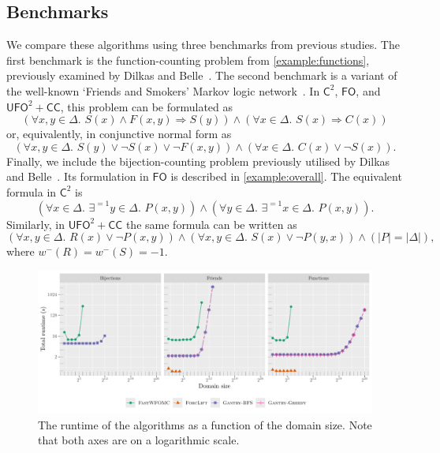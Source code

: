 \documentclass[a4paper,UKenglish,cleveref, autoref, thm-restate]{lipics-v2021}
\newcommand{\Ctwo}{$\mathsf{C}^{2}$}
\newcommand{\FO}{$\mathsf{FO}$}
\newcommand{\UFO}{$\mathsf{UFO}^{2} + \mathsf{CC}$}
\begin{document}

\subsection{Benchmarks}


We compare these algorithms using three benchmarks from previous studies. The
first benchmark is the function-counting problem from \cref{example:functions},
previously examined by Dilkas and Belle~\cite{DBLP:conf/kr/DilkasB23}. The
second benchmark is a variant of the well-known `Friends and Smokers' Markov
logic network~\cite{DBLP:conf/aaai/SinglaD08,DBLP:conf/uai/BroeckCD12}. In
\Ctwo{}, \FO{}, and \UFO{}, this problem can be formulated as
\[
  (\forall x,y \in \Delta\text{. } S(x) \land F(x, y) \Rightarrow S(y)) \land (\forall x \in \Delta\text{. }S(x) \Rightarrow C(x))
\]
or, equivalently, in conjunctive normal form as
\[
  (\forall x,y \in \Delta\text{. }S(y) \lor \neg S(x) \lor \neg F(x, y)) \land (\forall x \in \Delta\text{. } C(x) \lor \neg S(x)).
\]
Finally, we include the bijection-counting problem previously utilised by Dilkas
and Belle~\cite{DBLP:conf/kr/DilkasB23}. Its formulation in \FO{} is described
in \cref{example:overall}. The equivalent formula in \Ctwo{} is
\[
  (\forall x \in \Delta\text{. }\exists^{=1} y \in \Delta\text{. }P(x, y)) \land (\forall y \in \Delta\text{. }\exists^{=1} x \in \Delta\text{. }P(x, y)).
\]
Similarly, in \UFO{} the same formula can be written as
\[
  (\forall x, y \in \Delta\text{. }R(x) \lor \neg P(x, y)) \land (\forall x, y \in \Delta\text{. }S(x) \lor \neg P(y, x)) \land (|P| = |\Delta|),
\]
where $w^{-}(R) = w^{-}(S) = -1$.

\begin{figure}[t]
  \centering
  \includegraphics{plot.pdf}
  \caption{The runtime of the algorithms as a function of the domain size. Note
    that both axes are on a logarithmic scale.}\label{fig:plot}
\end{figure}
\end{document}
